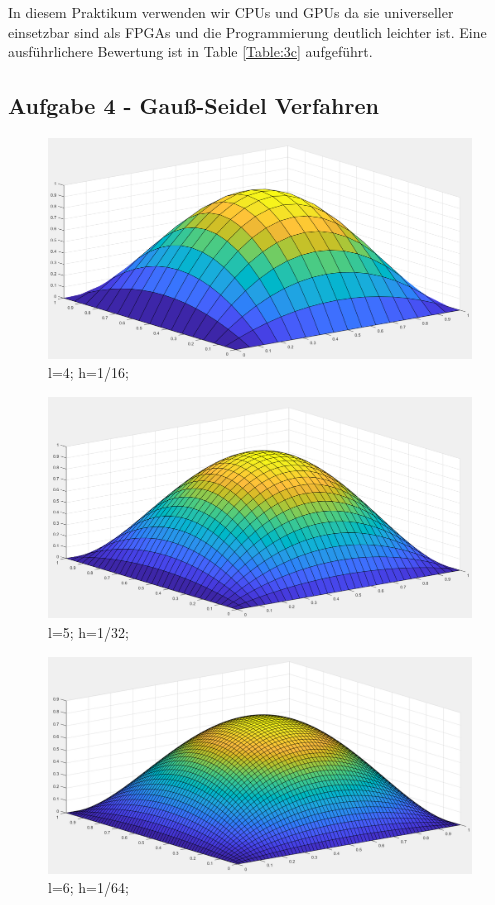 \documentclass{report}
\begin{document}
    In diesem Praktikum verwenden wir CPUs und GPUs da sie universeller einsetzbar sind als FPGAs und die Programmierung deutlich leichter ist. Eine ausführlichere Bewertung ist in Table \ref{Table:3c} aufgeführt.


    \subsection{Aufgabe 4 - Gauß-Seidel Verfahren}
	\begin{figure}
		\includegraphics[width=\linewidth]{Aufgaben-Ressourcen/A4L4.png}
		\caption{l=4; h=1/16;}
		\label{A4L4}
	\end{figure}
\begin{figure}
		\includegraphics[width=\linewidth]{Aufgaben-Ressourcen/A4L5.png} 
		\caption{l=5; h=1/32;}
		\label{A4L5}
	\end{figure}
	\begin{figure}
		\includegraphics[width=\linewidth]{Aufgaben-Ressourcen/A4L6.png} 
		\caption{l=6; h=1/64;}
		\label{A4L6}
	\end{figure}
\end{document}
